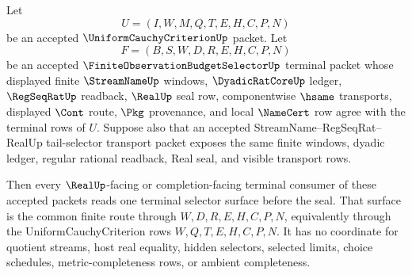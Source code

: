 \begin{theorem}
\label{thm:uniform-cauchy-criterion-terminal-selector-uniqueness}
Let
$$
U=(I,W,M,Q,T,E,H,C,P,N)
$$
be an accepted $\UniformCauchyCriterionUp$ packet. Let
$$
F=(B,S,W,D,R,E,H,C,P,N)
$$
be an accepted $\FiniteObservationBudgetSelectorUp$ terminal packet whose displayed finite $\StreamNameUp$ windows, $\DyadicRatCoreUp$ ledger, $\RegSeqRatUp$ readback, $\RealUp$ seal row, componentwise $\hsame$ transports, displayed $\Cont$ route, $\Pkg$ provenance, and local $\NameCert$ row agree with the terminal rows of $U$. Suppose also that an accepted StreamName--RegSeqRat--RealUp tail-selector transport packet exposes the same finite windows, dyadic ledger, regular rational readback, Real seal, and visible transport rows.

Then every $\RealUp$-facing or completion-facing terminal consumer of these accepted packets reads one terminal selector surface before the seal. That surface is the common finite route through $W,D,R,E,H,C,P,N$, equivalently through the UniformCauchyCriterion rows $W,Q,T,E,H,C,P,N$. It has no coordinate for quotient streams, host real equality, hidden selectors, selected limits, choice schedules, metric-completeness rows, or ambient completeness.
\end{theorem}
